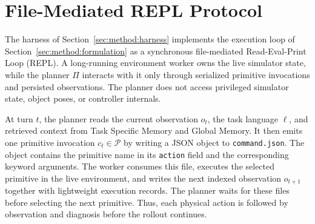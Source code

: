 \documentclass{article}
\begin{document}
\section{File-Mediated REPL Protocol}
  \label{app:harness}

  The harness of Section~\ref{sec:method:harness} implements the execution loop of
  Section~\ref{sec:method:formulation} as a synchronous file-mediated
  Read-Eval-Print Loop (REPL). A long-running environment worker owns the live simulator
  state, while the planner $\Pi$ interacts with it only through serialized primitive
  invocations and persisted observations. The planner does not access privileged
  simulator state, object poses, or controller internals.

  At turn $t$, the planner reads the current observation $o_t$, the task language
  $\ell$, and retrieved context from Task Specific Memory and Global Memory. It then
  emits one primitive invocation $c_t \in \mathcal{P}$ by writing a JSON object to
  \texttt{command.json}. The object contains the primitive name in its \texttt{action}
  field and the corresponding keyword arguments. The worker consumes this file, executes
  the selected primitive in the live environment, and writes the next indexed observation
  $o_{t+1}$ together with lightweight execution records. The planner waits for these
  files before selecting the next primitive. Thus, each physical action is followed by
  observation and diagnosis before the rollout continues.
\end{document}
